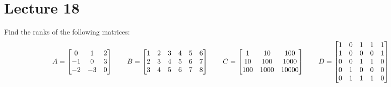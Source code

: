 \documentclass[a4paper]{amsart}
\begin{document}
\section{Lecture 18}

\begin{exercise}\label{ex-rank-i}
 Find the ranks of the following matrices:
 \[ 
  A = \left[\begin{matrix}
   0& 1& 2\\
  -1& 0& 3\\
  -2&-3& 0\\
  \end{matrix}\right] \qquad
  B = \left[\begin{matrix}
   1&2&3&4&5&6\\
   2&3&4&5&6&7\\
   3&4&5&6&7&8\\
  \end{matrix}\right] \qquad
  C = \left[\begin{matrix}
   1&10&100\\
   10&100&1000\\
   100&1000&10000\\
  \end{matrix}\right] \qquad
  D = \left[\begin{matrix}
   1&0&1&1&1\\
   1&0&0&0&1\\
   0&0&1&1&0\\
   0&1&0&0&0\\
   0&1&1&1&0\\
  \end{matrix}\right]
 \]
\end{exercise}
\end{document}
